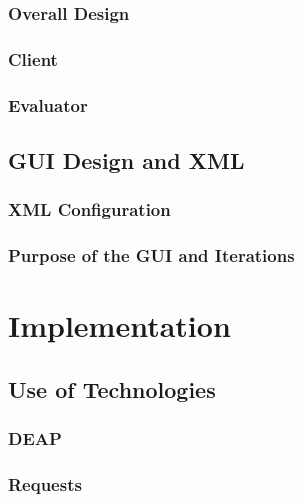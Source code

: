 \documentclass{l4proj}
\begin{document}
\subsection{Overall Design}


\subsection{Client}


\subsection{Evaluator}


\section{GUI Design and XML}


\subsection{XML Configuration}


\subsection{Purpose of the GUI and Iterations}



\chapter{Implementation}


\section{Use of Technologies}

\subsection{DEAP}


\subsection{Requests}

\end{document}
